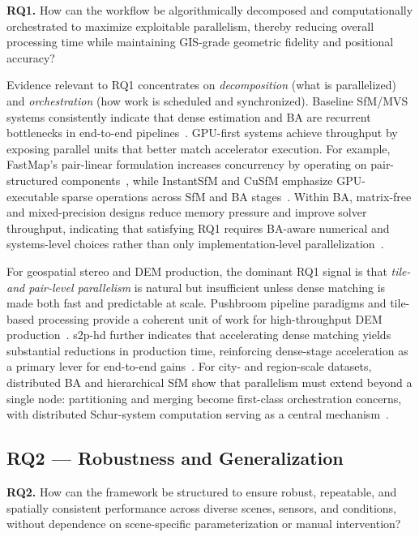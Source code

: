 \textbf{RQ1.} How can the workflow be algorithmically decomposed and computationally orchestrated to maximize exploitable parallelism, thereby reducing overall processing time while maintaining GIS-grade geometric fidelity and positional accuracy?

Evidence relevant to RQ1 concentrates on \emph{decomposition} (what is parallelized) and \emph{orchestration} (how work is scheduled and synchronized). Baseline SfM/MVS systems consistently indicate that dense estimation and BA are recurrent bottlenecks in end-to-end pipelines~\cite{Schonberger2016,Schonberger2016MVS}. GPU-first systems achieve throughput by exposing parallel units that better match accelerator execution. For example, FastMap’s pair-linear formulation increases concurrency by operating on pair-structured components~\cite{Li2025FastMap}, while InstantSfM and CuSfM emphasize GPU-executable sparse operations across SfM and BA stages~\cite{Zhong2025InstantSfM,Yu2025CuSfM}. Within BA, matrix-free and mixed-precision designs reduce memory pressure and improve solver throughput, indicating that satisfying RQ1 requires BA-aware numerical and systems-level choices rather than only implementation-level parallelization~\cite{Safari2025,Gopinath2025}.

For geospatial stereo and DEM production, the dominant RQ1 signal is that \emph{tile- and pair-level parallelism} is natural but insufficient unless dense matching is made both fast and predictable at scale. Pushbroom pipeline paradigms and tile-based processing provide a coherent unit of work for high-throughput DEM production~\cite{deFranchis2014}. s2p-hd further indicates that accelerating dense matching yields substantial reductions in production time, reinforcing dense-stage acceleration as a primary lever for end-to-end gains~\cite{Amadei2025}. For city- and region-scale datasets, distributed BA and hierarchical SfM show that parallelism must extend beyond a single node: partitioning and merging become first-class orchestration concerns, with distributed Schur-system computation serving as a central mechanism~\cite{Zheng2023,Li2025BALM,Zhou2026}.

\subsection{RQ2 --- Robustness and Generalization}

\textbf{RQ2.} How can the framework be structured to ensure robust, repeatable, and spatially consistent performance across diverse scenes, sensors, and conditions, without dependence on scene-specific parameterization or manual intervention?

